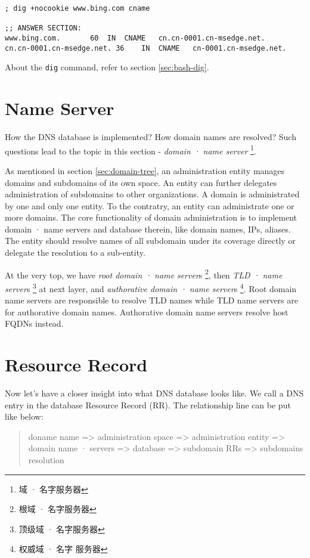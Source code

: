 \begin{lstlisting}
; dig +nocookie www.bing.com cname

;; ANSWER SECTION:
www.bing.com.		60	IN	CNAME	cn.cn-0001.cn-msedge.net.
cn.cn-0001.cn-msedge.net. 36	IN	CNAME	cn-0001.cn-msedge.net.
\end{lstlisting}

About the \lstinline|dig| command, refer to section
\ref{sec:bash-dig}.

\section{Name Server}
\label{sec:domain-name-server}

How the DNS database is implemented? How domain names are
resolved? Such questions lead to the topic in this section -
\textit{domain · name server} \footnote{域 · 名字服务器}.

As mentioned in section \ref{sec:domain-tree}, an administration
entity manages domains and subdomains of its own space. An entity
can further delegates administration of subdomains to other
organizations. A domain is administrated by one and only one
entity. To the contratry, an entity can administrate one or more
domains. The core functionality of domain administration is to
implement domain · name servers and database therein,
like domain names, IPs, aliases. The entity should resolve names
of all subdomain under its coverage directly or delegate the
resolution to a sub-entity.

At the very top, we have \textit{root domain · name server}s
\footnote{根域 · 名字服务器}, then \textit{TLD · name server}s
\footnote{顶级域 · 名字服务器} at next layer, and
\textit{authorative domain · name server}s \footnote{权威域 · 名字
  服务器}. Root domain name servers are responsible to resolve TLD
names while TLD name servers are for authorative domain
names. Authorative domain name servers resolve host FQDNs instead.

\section{Resource Record}
\label{sec:resource-record}

Now let's have a closer insight into what DNS database looks
like. We call a DNS entry in the database Resource Record
(RR). The relationship line can be put like below:

\begin{quotation}
  doname name => administration space => administration entity =>
  domain name · servers =>
  database => subdomain RRs => subdomains resolution \\
\end{quotation}

